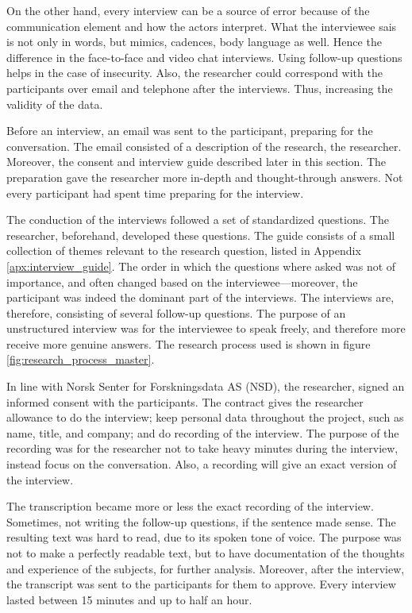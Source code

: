 On the other hand, every interview can be a source of error because of the communication element and how the actors interpret. What the interviewee sais is not only in words, but mimics, cadences, body language as well. Hence the difference in the face-to-face and video chat interviews. Using follow-up questions helps in the case of insecurity. Also, the researcher could correspond with the participants over email and telephone after the interviews. Thus, increasing the validity of the data. 

Before an interview, an email was sent to the participant, preparing for the conversation. The email consisted of a description of the research, the researcher. Moreover, the consent and interview guide described later in this section. The preparation gave the researcher more in-depth and thought-through answers. Not every participant had spent time preparing for the interview. 

The conduction of the interviews followed a set of standardized questions. The researcher, beforehand, developed these questions. The guide consists of a small collection of themes relevant to the research question, listed in Appendix \ref{apx:interview_guide}. The order in which the questions where asked was not of importance, and often changed based on the interviewee—moreover, the participant was indeed the dominant part of the interviews. The interviews are, therefore, consisting of several follow-up questions. The purpose of an unstructured interview was for the interviewee to speak freely, and therefore more receive more genuine answers. The research process used is shown in figure \ref{fig:research_process_master}.

In line with Norsk Senter for Forskningsdata AS (NSD), the researcher, signed an informed consent with the participants. The contract gives the researcher allowance to do the interview; keep personal data throughout the project, such as name, title, and company; and do recording of the interview. The purpose of the recording was for the researcher not to take heavy minutes during the interview, instead focus on the conversation. Also, a recording will give an exact version of the interview. 

The transcription became more or less the exact recording of the interview. Sometimes, not writing the follow-up questions, if the sentence made sense. The resulting text was hard to read, due to its spoken tone of voice. The purpose was not to make a perfectly readable text, but to have documentation of the thoughts and experience of the subjects, for further analysis. Moreover, after the interview, the transcript was sent to the participants for them to approve. Every interview lasted between 15 minutes and up to half an hour.

